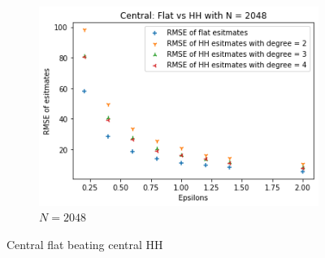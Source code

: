 \documentclass[11pt]{article}
\theoremstyle{definition}
\begin{document}
\begin{figure}[H]
\begin{subfigure}{.3\textwidth}
  \includegraphics[width=\linewidth]{figures/central_flat_hh/flat_beat_hh_N=2048.png}
  \caption{$N=2048$}
  \label{fig:cen_flat_hh3}
\end{subfigure}
\caption{Central flat beating central HH}
\label{fig:cen_flat_hh}
\end{figure}
\end{document}
